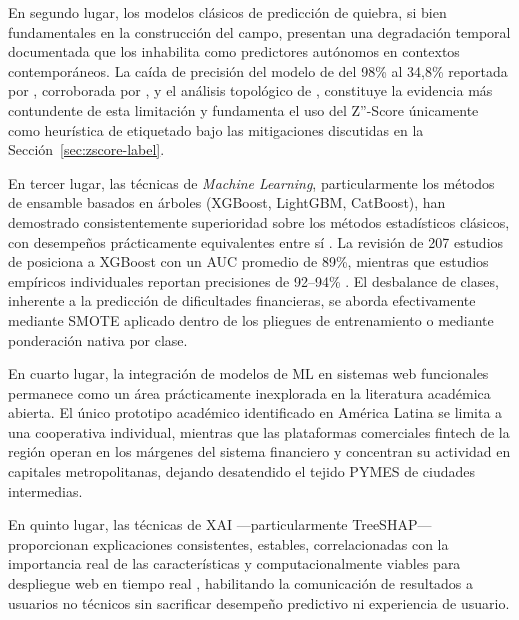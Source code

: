 \documentclass[12pt, letterpaper]{article}
\begin{document}
En segundo lugar, los modelos cl\'asicos de predicci\'on de quiebra, si bien fundamentales en la construcci\'on del campo, presentan una degradaci\'on temporal documentada que los inhabilita como predictores aut\'onomos en contextos contempor\'aneos. La ca\'ida de precisi\'on del modelo de \citet{Ohlson1980} del 98\% al 34,8\% reportada por \citet{Grice2003}, corroborada por \citet{Bouwmeester2020}, \citet{Papadouli2024} y el an\'alisis topol\'ogico de \citet{Qiu2020}, constituye la evidencia m\'as contundente de esta limitaci\'on y fundamenta el uso del Z''-Score \'unicamente como heur\'istica de etiquetado bajo las mitigaciones discutidas en la Secci\'on~\ref{sec:zscore-label}.

En tercer lugar, las t\'ecnicas de \textit{Machine Learning}, particularmente los m\'etodos de ensamble basados en \'arboles (XGBoost, LightGBM, CatBoost), han demostrado consistentemente superioridad sobre los m\'etodos estad\'isticos cl\'asicos, con desempe\~nos pr\'acticamente equivalentes entre s\'i \citep{Sujatha2025}. La revisi\'on de 207 estudios de \citet{Dasilas2024} posiciona a XGBoost con un AUC promedio de 89\%, mientras que estudios emp\'iricos individuales reportan precisiones de 92--94\% \citep{Boumhidi2025, Yufenyuy2024, Mahesh2025}. El desbalance de clases, inherente a la predicci\'on de dificultades financieras, se aborda efectivamente mediante SMOTE aplicado dentro de los pliegues de entrenamiento \citep{Sun2020, Kristanti2025} o mediante ponderaci\'on nativa por clase.

En cuarto lugar, la integraci\'on de modelos de ML en sistemas web funcionales permanece como un \'area pr\'acticamente inexplorada en la literatura acad\'emica abierta. El \'unico prototipo acad\'emico identificado en Am\'erica Latina \citep{MayorgaLira2023} se limita a una cooperativa individual, mientras que las plataformas comerciales fintech de la regi\'on \citep{Ioannou2022} operan en los m\'argenes del sistema financiero y concentran su actividad en capitales metropolitanas, dejando desatendido el tejido PYMES de ciudades intermedias.

En quinto lugar, las t\'ecnicas de XAI ---particularmente TreeSHAP--- proporcionan explicaciones consistentes, estables, correlacionadas con la importancia real de las caracter\'isticas \citep{Pathi2025, Lin2024, Bussmann2020} y computacionalmente viables para despliegue web en tiempo real \citep{LundbergTreeSHAP2020, Deng2024}, habilitando la comunicaci\'on de resultados a usuarios no t\'ecnicos sin sacrificar desempe\~no predictivo ni experiencia de usuario.
\end{document}
